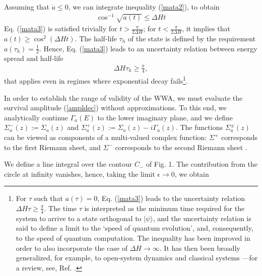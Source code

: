 \documentclass[12pt]{article}
\numberwithin{equation}{section}
\begin{document}
  Assuming that $\dot{a} \leq 0$, we can integrate inequality   (\ref{mata2}), to obtain
\begin{eqnarray}
\cos^{-1} \sqrt{a(t)} \leq  \Delta H t  \label{mata3}
\end{eqnarray}
Eq. (\ref{mata3})  is satisfied trivially for
 $t > \frac{\pi}{2\Delta H}$; for $t < \frac{\pi}{2\Delta H}$, it implies that  $a(t) \geq    \cos^2(\Delta H t)$. The half-life $\tau_h$  of the state is defined by the requirement
  $a(\tau_h) = \frac{1}{2}$. Hence, Eq.  (\ref{mata3}) leads to an uncertainty relation between energy spread and half-life
\begin{eqnarray}
\Delta H \tau_h \geq \frac{\pi}{4},
\end{eqnarray}
 that applies even in regimes where exponential decay fails\footnote{For  $\tau$ such that $a(\tau) = 0$, Eq.  (\ref{mata3}) leads to the uncertainty relation $\Delta H \tau \geq \frac{\pi}{4}$. The time $\tau$ is interpreted as the minimum time required for the system to arrive to a state orthogonal to $|\psi\rangle$, and the uncertainty relation is said to define a limit to the `speed of quantum evolution', and, consequently, to the speed of quantum computation. The inequality has been improved \cite{MaLe, LeTo} in order to also incorporate the case of $\Delta H \rightarrow \infty$. It has then been broadly generalized, for example, to open-system dynamics \cite{MLOS} and classical systems \cite{Shan}---for a review, see, Ref. \cite{DeCa}.  }.

\medskip

 In order to establish the  range of validity of the WWA, we must evaluate the survival amplitude (\ref{ampldec}) without approximations. To this end, we analytically continue  $\Gamma_a(E)$ to the lower imaginary plane, and we define   $\Sigma^-_a(z) := \Sigma_a(z)$ and $ \Sigma^+_a(z) := \Sigma_a(z) - i \Gamma_a(z)$.   The functions $\Sigma^{\pm}_a(z)$ can be viewed as components of a multi-valued complex function: $\Sigma^+$ corresponds to  the first Riemann sheet, and $\Sigma^-$ corresponds to the second Riemann sheet \cite{colth}.

We define a line integral over the contour $C_-$ of Fig. 1.  The contribution from the  circle at infinity vanishes, hence, taking the limit $\epsilon \rightarrow 0$, we obtain
\end{document}
